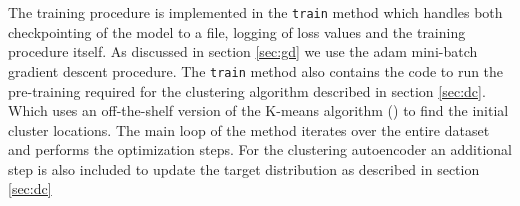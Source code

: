 % 

The training procedure is implemented in the \lstinline{train} method which handles both checkpointing of the model to a file, logging of loss values and the training procedure itself. As discussed in section \ref{sec:gd} we use the adam mini-batch gradient descent procedure. The \lstinline{train} method also contains the code to run the pre-training required for the clustering algorithm described in section \ref{sec:dc}. Which uses an off-the-shelf version of the K-means algorithm () to find the initial cluster locations. The main loop of the method iterates over the entire dataset and performs the optimization steps. For the clustering autoencoder an additional step is also included to update the target distribution as described in section \ref{sec:dc}
